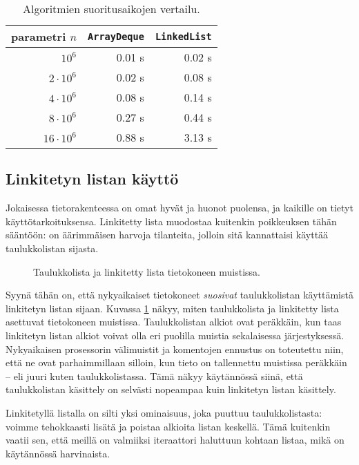 \begin{table}
\center
\begin{tabular}{rrr}
parametri $n$ & \texttt{ArrayDeque} & \texttt{LinkedList} \\
\hline
$10^6$ & 0.01 s & 0.02 s \\
$2 \cdot 10^6$ & 0.02 s & 0.08 s \\
$4 \cdot 10^6$ & 0.08 s & 0.14 s \\
$8 \cdot 10^6$ & 0.27 s & 0.44 s \\
$16 \cdot 10^6$ & 0.88 s & 3.13 s \\
\end{tabular}
\caption{Algoritmien suoritusaikojen vertailu.}
\label{tab:lispoi}
\end{table}

\subsection{Linkitetyn listan käyttö}

Jokaisessa tietorakenteessa on omat hyvät ja huonot puolensa,
ja kaikille on tietyt käyttötarkoituksensa.
Linkitetty lista muodostaa kuitenkin poikkeuksen tähän sääntöön:
on äärimmäisen harvoja tilanteita, jolloin sitä kannattaisi
käyttää taulukkolistan sijasta.

\begin{figure}
\center
{}
\caption{Taulukkolista ja linkitetty lista tietokoneen muistissa.}
\label{fig:taulin}
\end{figure}

Syynä tähän on, että nykyaikaiset tietokoneet
\emph{suosivat} taulukkolistan käyttämistä linkitetyn listan sijaan.
Kuvassa \ref{fig:taulin} näkyy, miten taulukkolista ja linkitetty lista
asettuvat tietokoneen muistissa.
Taulukkolistan alkiot ovat peräkkäin, kun taas linkitetyn
listan alkiot voivat olla eri puolilla muistia sekalaisessa
järjestyksessä.
Nykyaikaisen prosessorin välimuistit ja komentojen ennustus
on toteutettu niin, että ne ovat parhaimmillaan silloin,
kun tieto on tallennettu muistissa peräkkäin -- eli juuri kuten
taulukkolistassa.
Tämä näkyy käytännössä siinä, että taulukkolistan käsittely on selvästi
nopeampaa kuin linkitetyn listan käsittely.

Linkitetyllä listalla on silti yksi ominaisuus,
joka puuttuu taulukkolistasta: voimme tehokkaasti
lisätä ja poistaa alkioita listan keskellä.
Tämä kuitenkin vaatii sen, että meillä on valmiiksi
iteraattori haluttuun kohtaan listaa,
mikä on käytännössä harvinaista.